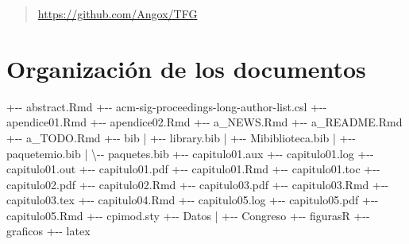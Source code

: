 \documentclass[12pt,a4paper,]{book}
\newenvironment{Shaded}{\begin{snugshade}}{\end{snugshade}}
\newcommand{\NormalTok}[1]{#1}
\newcommand{\SpecialCharTok}[1]{\textcolor[rgb]{0.00,0.00,0.00}{#1}}
\numberwithin{dummy}{section}
\theoremstyle{ocrenumbox}
\theoremstyle{blacknumex}
\theoremstyle{blacknumbox}
\theoremstyle{ocrenum}
\theoremstyle{ocrenum}
\begin{document}
\begin{quote}
\url{https://github.com/Angox/TFG}
\end{quote}

\hypertarget{organizaciuxf3n-de-los-documentos}{%
\section{Organización de los
documentos}\label{organizaciuxf3n-de-los-documentos}}

\begin{Shaded}
\begin{Highlighting}[]
\SpecialCharTok{+{-}{-}}\NormalTok{ abstract.Rmd}
\SpecialCharTok{+{-}{-}}\NormalTok{ acm}\SpecialCharTok{{-}}\NormalTok{sig}\SpecialCharTok{{-}}\NormalTok{proceedings}\SpecialCharTok{{-}}\NormalTok{long}\SpecialCharTok{{-}}\NormalTok{author}\SpecialCharTok{{-}}\NormalTok{list.csl}
\SpecialCharTok{+{-}{-}}\NormalTok{ apendice01.Rmd}
\SpecialCharTok{+{-}{-}}\NormalTok{ apendice02.Rmd}
\SpecialCharTok{+{-}{-}}\NormalTok{ a\_NEWS.Rmd}
\SpecialCharTok{+{-}{-}}\NormalTok{ a\_README.Rmd}
\SpecialCharTok{+{-}{-}}\NormalTok{ a\_TODO.Rmd}
\SpecialCharTok{+{-}{-}}\NormalTok{ bib}
\SpecialCharTok{|}   \SpecialCharTok{+{-}{-}}\NormalTok{ library.bib}
\SpecialCharTok{|}   \SpecialCharTok{+{-}{-}}\NormalTok{ Mibiblioteca.bib}
\SpecialCharTok{|}   \SpecialCharTok{+{-}{-}}\NormalTok{ paquetemio.bib}
\SpecialCharTok{|}\NormalTok{   \textbackslash{}}\SpecialCharTok{{-}{-}}\NormalTok{ paquetes.bib}
\SpecialCharTok{+{-}{-}}\NormalTok{ capitulo01.aux}
\SpecialCharTok{+{-}{-}}\NormalTok{ capitulo01.log}
\SpecialCharTok{+{-}{-}}\NormalTok{ capitulo01.out}
\SpecialCharTok{+{-}{-}}\NormalTok{ capitulo01.pdf}
\SpecialCharTok{+{-}{-}}\NormalTok{ capitulo01.Rmd}
\SpecialCharTok{+{-}{-}}\NormalTok{ capitulo01.toc}
\SpecialCharTok{+{-}{-}}\NormalTok{ capitulo02.pdf}
\SpecialCharTok{+{-}{-}}\NormalTok{ capitulo02.Rmd}
\SpecialCharTok{+{-}{-}}\NormalTok{ capitulo03.pdf}
\SpecialCharTok{+{-}{-}}\NormalTok{ capitulo03.Rmd}
\SpecialCharTok{+{-}{-}}\NormalTok{ capitulo03.tex}
\SpecialCharTok{+{-}{-}}\NormalTok{ capitulo04.Rmd}
\SpecialCharTok{+{-}{-}}\NormalTok{ capitulo05.log}
\SpecialCharTok{+{-}{-}}\NormalTok{ capitulo05.pdf}
\SpecialCharTok{+{-}{-}}\NormalTok{ capitulo05.Rmd}
\SpecialCharTok{+{-}{-}}\NormalTok{ cpimod.sty}
\SpecialCharTok{+{-}{-}}\NormalTok{ Datos}
\SpecialCharTok{|}   \SpecialCharTok{+{-}{-}}\NormalTok{ Congreso}
\SpecialCharTok{+{-}{-}}\NormalTok{ figurasR}
\SpecialCharTok{+{-}{-}}\NormalTok{ graficos}
\SpecialCharTok{+{-}{-}}\NormalTok{ latex}

\end{Highlighting}
\end{Shaded}
\end{document}
